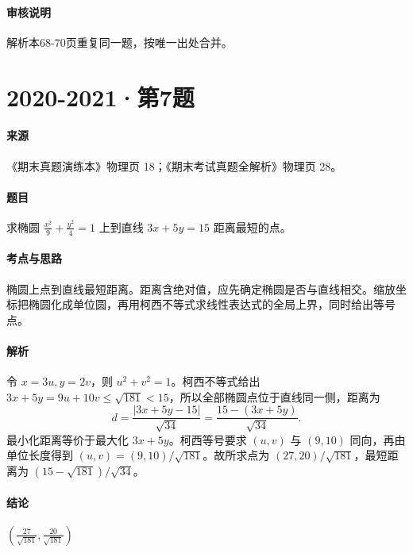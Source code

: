 \documentclass[UTF8,fontset=fandol,12pt,oneside,openany]{ctexrep}
\theoremstyle{definition}
\begin{document}
\paragraph{审核说明}
解析本68-70页重复同一题，按唯一出处合并。

\par\addvspace{18pt}\noindent\begin{minipage}{\linewidth}
\section{2020-2021·第7题}
\paragraph{来源}《期末真题演练本》物理页 18；《期末考试真题全解析》物理页 28。
\paragraph{题目}
求椭圆 $\frac{x^2}9+\frac{y^2}4=1$ 上到直线 $3x+5y=15$ 距离最短的点。
\end{minipage}\par
\paragraph{考点与思路}
椭圆上点到直线最短距离。距离含绝对值，应先确定椭圆是否与直线相交。缩放坐标把椭圆化成单位圆，再用柯西不等式求线性表达式的全局上界，同时给出等号点。
\paragraph{解析}
令 $x=3u,y=2v$，则 $u^2+v^2=1$。柯西不等式给出 $3x+5y=9u+10v\le\sqrt{181}<15$，所以全部椭圆点位于直线同一侧，距离为
\[d=\frac{|3x+5y-15|}{\sqrt{34}}=\frac{15-(3x+5y)}{\sqrt{34}}.\]
最小化距离等价于最大化 $3x+5y$。柯西等号要求 $(u,v)$ 与 $(9,10)$ 同向，再由单位长度得到 $(u,v)=(9,10)/\sqrt{181}$。故所求点为 $(27,20)/\sqrt{181}$，最短距离为 $(15-\sqrt{181})/\sqrt{34}$。
\paragraph{结论}
$\left(\frac{27}{\sqrt{181}},\frac{20}{\sqrt{181}}\right)$
\end{document}
